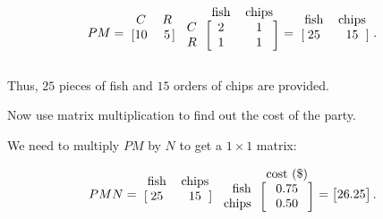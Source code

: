 \documentclass[../gatm_answers.tex]{subfiles}
\begin{document}
$$PM = \begin{blockarray}{cc}
C & R \\
\begin{block}{[cc]}
10 & 5 \\
\end{block}
\end{blockarray}\begin{blockarray}{rcc}
& \text{fish} & \text{chips} \\
\begin{block}{r[cc]}
C & 2 & 1 \\
R & 1 & 1 \\
\end{block}
\end{blockarray} = \begin{blockarray}{cc}
\text{fish} & \text{chips} \\
\begin{block}{[cc]}
25 & 15 \\
\end{block}
\end{blockarray}.$$

Thus, $25$ pieces of fish and $15$ orders of chips are provided.

\begin{inner_problem}
\item Now use matrix multiplication to find out the cost of the party.
\end{inner_problem}

We need to multiply $PM$ by $N$ to get a $1\times 1$ matrix:

$$PMN = \begin{blockarray}{cc}
\text{fish} & \text{chips} \\
\begin{block}{[cc]}
25 & 15 \\
\end{block}
\end{blockarray}\begin{blockarray}{rc}
& \text{cost (\$)} \\
\begin{block}{r[c]}
\text{fish} & 0.75 \\
\text{chips} & 0.50 \\
\end{block}
\end{blockarray} = \begin{bmatrix}
26.25 \\
\end{bmatrix}.$$
\end{document}

